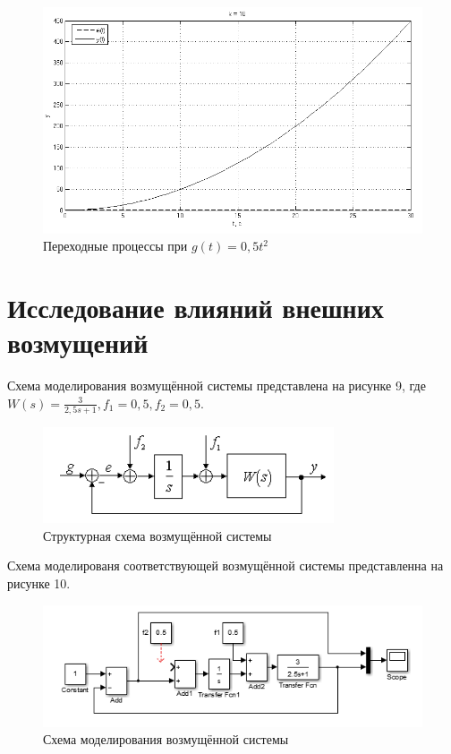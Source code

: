 \documentclass[a4paper, 11pt, russian]{article}
\begin{document}
    \begin{figure}[ht!]
        \centering
        \includegraphics[scale = 0.75]{aInput1ast10k.png}
        \caption{Переходные процессы при $g(t) = 0,5t^2$}
    \end{figure}
    \vspace{1.5cm}
    \section{Исследование влияний внешних возмущений}
    Схема моделирования возмущённой системы представлена на рисунке 9, где $W(s) = \displaystyle{\frac{3}{2,5s + 1}}, f_1 = 0,5, f_2 = 0,5.$\\
    \vspace{1.5cm}
    \begin{figure}[t!]
        \centering
        \includegraphics{disturbScheme.PNG}
        \caption{Структурная схема возмущённой системы}
    \end{figure}
    
    Схема моделированя соответствующей возмущённой системы представленна на рисунке 10.
    
    \begin{figure}[h!]
        \centering
        \includegraphics{dstScheme.PNG}
        \caption{Схема моделирования возмущённой системы}
    \end{figure}
    
\end{document}
